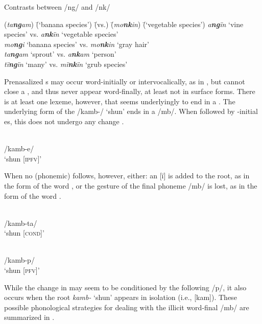 \ea%
    \label{ex:phon:15}
          Contrasts between /ng/ and /nk/\\
\begin{tabbing}
{(\textit{ta\textbf{ng}am})} \= {(‘banana species’)} \= {(vs.)} \= {(\textit{mo\textbf{nk}in})} \= {(‘vegetable species’)}\kill
{\textit{a\textbf{ng}ïn}} \> {‘vine species’} \> {vs.} \> {\textit{a\textbf{nk}ïn}} \> {‘vegetable species’}\\
{\textit{mo\textbf{ng}i}} \> {‘banana species’} \> {vs.} \> {\textit{mo\textbf{nk}in}} \> {‘gray hair’}\\
{\textit{ta\textbf{ng}am}} \> {‘sprout’} \> {vs.} \> {\textit{a\textbf{nk}am}} \> {‘person’}\\
{\textit{tï\textbf{ng}ïn}} \> {‘many’} \> {vs.} \> {\textit{mï\textbf{nk}ïn}} \> {‘grub species’}
\end{tabbing}
\z

Prenasalized  s may occur word-initially or intervocalically, as in , but cannot close a , and thus never appear word-finally, at least not in surface forms. There is at least one lexeme, however, that seems underlyingly to end in a   . The underlying form of the  /kamb-/ ‘shun’ ends in a     /mb/. When followed by -initial es, this  does not undergo any  change .

\ea%
    \label{ex:phon:15a}
\gll \normalfont[kambe]\\
/kamb-e/\\
\glt ‘shun [\textsc{ipfv}]’
  \z
  
When no (phonemic)  follows, however, either: an  [ï] is added to the root, as in the  form of the word , or the  gesture of the final phoneme /mb/ is lost, as in the  form of the word .

\ea%
    \label{ex:phon:15b}
\gll \normalfont[kambïta]\\
/kamb-ta/\\
\glt ‘shun [\textsc{cond}]’
  \z

\ea%
    \label{ex:phon:15c}
\gll \normalfont[kamp]\\
/kamb-p/\\
\glt ‘shun [\textsc{pfv}]’
  \z

While the change in  may seem to be conditioned by the following  /p/, it also occurs when the root \textit{kamb-} ‘shun’ appears in isolation (i.e., [kam]). These possible phonological strategies for dealing with the illicit word-final /mb/ are summarized in .

